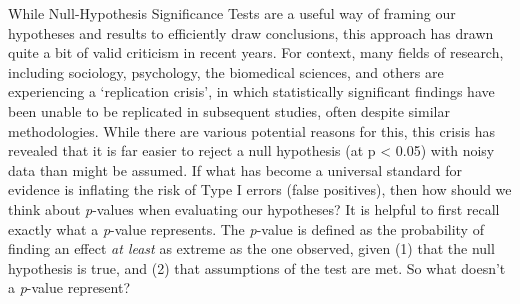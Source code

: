 \documentclass[]{book}
\begin{document}
While Null-Hypothesis Significance Tests are a useful way of framing our hypotheses and results to efficiently draw conclusions, this approach has drawn quite a bit of valid criticism in recent years. For context, many fields of research, including sociology, psychology, the biomedical sciences, and others are experiencing a `replication crisis', in which statistically significant findings have been unable to be replicated in subsequent studies, often despite similar methodologies. While there are various potential reasons for this, this crisis has revealed that it is far easier to reject a null hypothesis (at p \textless{} 0.05) with noisy data than might be assumed. If what has become a universal standard for evidence is inflating the risk of Type I errors (false positives), then how should we think about \emph{p}-values when evaluating our hypotheses? It is helpful to first recall exactly what a \emph{p}-value represents. The \emph{p}-value is defined as the probability of finding an effect \emph{at least} as extreme as the one observed, given (1) that the null hypothesis is true, and (2) that assumptions of the test are met. So what doesn't a \emph{p}-value represent?
\end{document}
